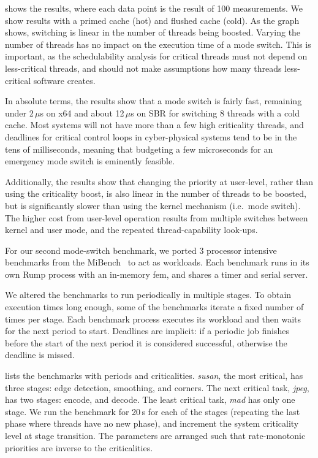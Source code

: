  shows the results, where each data point is the result of 100 measurements.
We show results with a primed cache (hot) and flushed cache (cold).
As the graph shows, switching is linear in the number of  threads being boosted. Varying the number
of  threads has no impact on the execution time of a mode switch.
This is important, as the schedulability analysis for critical threads
must not depend on less-critical threads, and should not make
assumptions how many threads less-critical software creates.

In absolute terms, the results show that a mode switch is fairly fast,
remaining under 2\,$\mu$s on x64 and about 12\,\(\mu\)s on SBR for switching 8 threads
with a cold cache. Most systems will not have more than a few high
criticality threads, and deadlines for critical control loops in
cyber-physical systems tend to be in the tens of milliseconds, meaning
that budgeting a few microseconds for an emergency mode switch is eminently
feasible.

Additionally, the results show that changing the priority at user-level, rather than using the
criticality boost, is also linear in the number of threads to be boosted, but  is significantly slower than using the kernel mechanism (i.e.\ mode switch).
The higher cost from user-level operation results from  multiple switches between kernel and user mode, and the repeated thread-capability look-ups.

For our second mode-switch benchmark, we ported 3 processor intensive benchmarks from the
MiBench~\citep{Guthaus_REAMB_01} to act as workloads. Each benchmark runs in its own Rump process
with an in-memory fem, and shares a timer and serial server.

We altered the benchmarks to run periodically in multiple stages. To obtain
execution times long enough, some of the benchmarks iterate a fixed number of times per
stage. Each benchmark process executes its workload and then waits for the next period to start.
Deadlines are implicit: if a periodic job finishes before the start of the next period it is
considered successful, otherwise the deadline is missed.

 lists the benchmarks with periods and criticalities.
\textit{susan}, the most critical, has three stages: edge detection, smoothing, and corners. The
next critical task, \textit{jpeg}, has two stages: encode, and decode. The least
critical task, \textit{mad} has only one stage. We run the benchmark
for 20\,s for each of the stages (repeating the last phase where
threads have no new phase), and
increment the system criticality level at stage transition. The parameters are arranged such that
rate-monotonic priorities are inverse to the criticalities.

